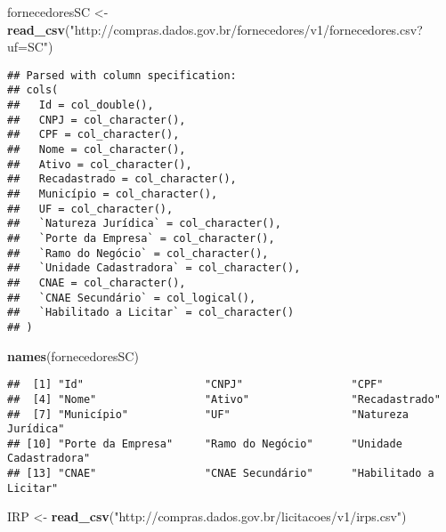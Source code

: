 \documentclass[]{article}
\newenvironment{Shaded}{\begin{snugshade}}{\end{snugshade}}
\newcommand{\KeywordTok}[1]{\textcolor[rgb]{0.13,0.29,0.53}{\textbf{#1}}}
\newcommand{\StringTok}[1]{\textcolor[rgb]{0.31,0.60,0.02}{#1}}
\newcommand{\NormalTok}[1]{#1}
\begin{document}
\begin{Shaded}
\begin{Highlighting}[]
\NormalTok{fornecedoresSC <-}\StringTok{ }\KeywordTok{read_csv}\NormalTok{(}\StringTok{"http://compras.dados.gov.br/fornecedores/v1/fornecedores.csv?uf=SC"}\NormalTok{)}
\end{Highlighting}
\end{Shaded}

\begin{verbatim}
## Parsed with column specification:
## cols(
##   Id = col_double(),
##   CNPJ = col_character(),
##   CPF = col_character(),
##   Nome = col_character(),
##   Ativo = col_character(),
##   Recadastrado = col_character(),
##   Município = col_character(),
##   UF = col_character(),
##   `Natureza Jurídica` = col_character(),
##   `Porte da Empresa` = col_character(),
##   `Ramo do Negócio` = col_character(),
##   `Unidade Cadastradora` = col_character(),
##   CNAE = col_character(),
##   `CNAE Secundário` = col_logical(),
##   `Habilitado a Licitar` = col_character()
## )
\end{verbatim}

\begin{Shaded}
\begin{Highlighting}[]
\KeywordTok{names}\NormalTok{(fornecedoresSC)}
\end{Highlighting}
\end{Shaded}

\begin{verbatim}
##  [1] "Id"                   "CNPJ"                 "CPF"                 
##  [4] "Nome"                 "Ativo"                "Recadastrado"        
##  [7] "Município"            "UF"                   "Natureza Jurídica"   
## [10] "Porte da Empresa"     "Ramo do Negócio"      "Unidade Cadastradora"
## [13] "CNAE"                 "CNAE Secundário"      "Habilitado a Licitar"
\end{verbatim}

\begin{Shaded}
\begin{Highlighting}[]
\NormalTok{IRP <-}\StringTok{ }\KeywordTok{read_csv}\NormalTok{(}\StringTok{"http://compras.dados.gov.br/licitacoes/v1/irps.csv"}\NormalTok{)}
\end{Highlighting}
\end{Shaded}
\end{document}
